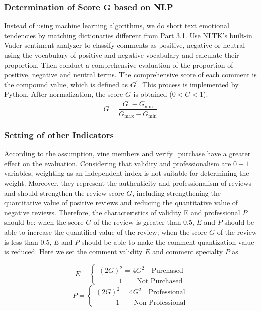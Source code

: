 \documentclass{mcmthesis}
\begin{document}
\subsubsection{Determination of Score $\mathbf{G}$ based on NLP}
Instead of using machine learning algorithms, we do short text emotional tendencies by matching dictionaries different from Part 3.1. Use NLTK's built-in Vader sentiment analyzer to classify comments as positive, negative or neutral using the vocabulary of positive and negative vocabulary and calculate their proportion. Then conduct a comprehensive evaluation of the proportion of positive, negative and neutral terms. The comprehensive score of each comment is the compound value, which is defined as $ G^{'}$. This process is implemented by Python. After normalization, the score $ G $ is obtained ($ 0 <G <1 $).
\begin{equation}
G=\frac{G^{'}-G_{\min}}{G_{\max}-G_{\min}}
\end{equation}
\subsubsection{Setting of other Indicators}
According to the assumption, vine members and verify\_purchase have a greater effect on the evaluation. Considering that validity and professionalism are $ 0-1 $ variables, weighting as an independent index is not suitable for determining the weight. Moreover, they represent the authenticity and professionalism of reviews and should strengthen the review score $ G $, including strengthening the quantitative value of positive reviews and reducing the quantitative value of negative reviews. Therefore, the characteristics of validity E and professional $ P $ should be: when the score $ G $ of the review is greater than 0.5, $ E $ and $ P $ should be able to increase the quantified value of the review; when the score $ G $ of the review is less than 0.5, $ E $ and $ P $ should be able to make the comment quantization value is reduced. Here we set the comment validity $ E $ and comment specialty $ P $ as


\begin{equation}
E=\left\{ \begin{array}{l} 	\left( 2G \right) ^2=4G^2 \quad \text{Purchased} \\ \qquad \ \ \ \ 1 \qquad \text{Not Purchased} \end{array} \right.
\end{equation}
\begin{equation}
P=\left\{ \begin{array}{l} 	 \left( 2G \right) ^2=4G^2 \quad \text{Professional}\\ \qquad \ \ \ \ 1 \qquad \text{Non-Professional} \end{array} \right.
\end{equation}
\end{document}
